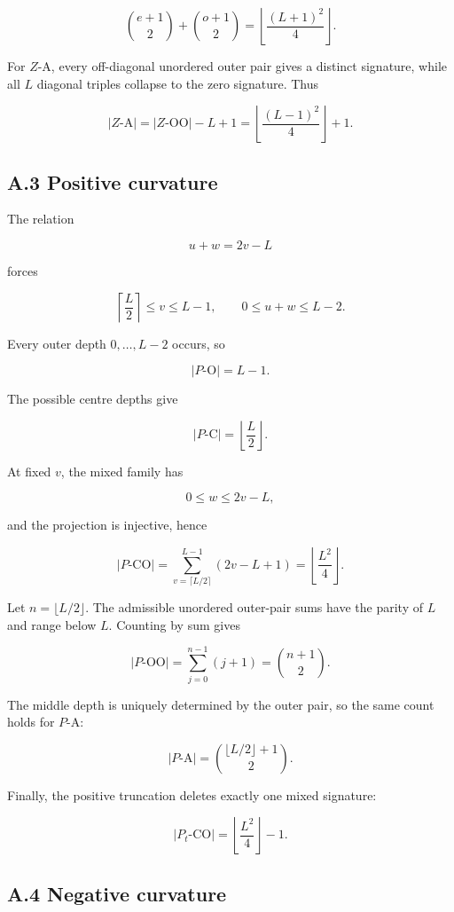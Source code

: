 \documentclass[
  british,
  a4paper,
  11pt]{article}
\begin{document}
\[
\binom{e+1}{2}+\binom{o+1}{2}
=
\left\lfloor\frac{(L+1)^2}{4}\right\rfloor.
\]

For \(Z\)-A, every off-diagonal unordered outer pair gives a distinct
signature, while all \(L\) diagonal triples collapse to the zero
signature. Thus

\[
|Z\text{-A}|
=
|Z\text{-OO}|-L+1
=
\left\lfloor\frac{(L-1)^2}{4}\right\rfloor+1.
\]

\subsection{A.3 Positive curvature}\label{a.3-positive-curvature}

The relation

\[
u+w=2v-L
\]

forces

\[
\left\lceil\frac L2\right\rceil\le v\le L-1,
\qquad
0\le u+w\le L-2.
\]

Every outer depth \(0,\ldots,L-2\) occurs, so

\[
|P\text{-O}|=L-1.
\]

The possible centre depths give

\[
|P\text{-C}|=\left\lfloor\frac L2\right\rfloor.
\]

At fixed \(v\), the mixed family has

\[
0\le w\le2v-L,
\]

and the projection is injective, hence

\[
|P\text{-CO}|
=
\sum_{v=\lceil L/2\rceil}^{L-1}(2v-L+1)
=
\left\lfloor\frac{L^2}{4}\right\rfloor.
\]

Let \(n=\lfloor L/2\rfloor\). The admissible unordered outer-pair sums
have the parity of \(L\) and range below \(L\). Counting by sum gives

\[
|P\text{-OO}|
=
\sum_{j=0}^{n-1}(j+1)
=
\binom{n+1}{2}.
\]

The middle depth is uniquely determined by the outer pair, so the same
count holds for \(P\)-A:

\[
|P\text{-A}|
=
\binom{\lfloor L/2\rfloor+1}{2}.
\]

Finally, the positive truncation deletes exactly one mixed signature:

\[
|P_t\text{-CO}|
=
\left\lfloor\frac{L^2}{4}\right\rfloor-1.
\]

\subsection{A.4 Negative curvature}\label{a.4-negative-curvature}
\end{document}
